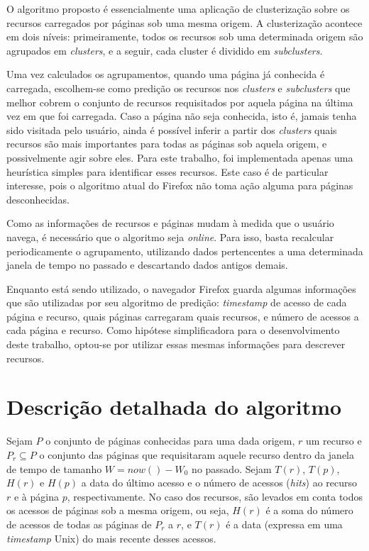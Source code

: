 \documentclass[10pt,twocolumn,letterpaper]{article}
\begin{document}
O algoritmo proposto é essencialmente uma aplicação de clusterização sobre os recursos carregados por páginas sob uma mesma origem. A clusterização acontece em dois níveis: primeiramente, todos os recursos sob uma determinada origem são agrupados em \emph{clusters}, e a seguir, cada cluster é dividido em \emph{subclusters}.

Uma vez calculados os agrupamentos, quando uma página já conhecida é carregada, escolhem-se como predição os recursos nos \emph{clusters} e \emph{subclusters} que melhor cobrem o conjunto de recursos requisitados por aquela página na última vez em que foi carregada. Caso a página não seja conhecida, isto é, jamais tenha sido visitada pelo usuário, ainda é possível inferir a partir dos \emph{clusters} quais recursos são mais importantes para todas as páginas sob aquela origem, e possivelmente agir sobre eles. Para este trabalho, foi implementada apenas uma heurística simples para identificar esses recursos. Este caso é de particular interesse, pois o algoritmo atual do Firefox não toma ação alguma para páginas desconhecidas. 

Como as informações de recursos e páginas mudam à medida que o usuário navega, é necessário que o algoritmo seja \emph{online}. Para isso, basta recalcular periodicamente o agrupamento, utilizando dados pertencentes a uma determinada janela de tempo no passado e descartando dados antigos demais.

Enquanto está sendo utilizado, o navegador Firefox guarda algumas informações que são utilizadas por seu algoritmo de predição: \emph{timestamp} de acesso de cada página e recurso, quais páginas carregaram quais recursos, e número de acessos a cada página e recurso. Como hipótese simplificadora para o desenvolvimento deste trabalho, optou-se por utilizar essas mesmas informações para descrever recursos.

\section{Descrição detalhada do algoritmo}
\label{sec-algorithm-detail}

Sejam $P$ o conjunto de páginas conhecidas para uma dada origem, $r$ um recurso e $P_{r} \subseteq P$ o conjunto das páginas que requisitaram aquele recurso dentro da janela de tempo de tamanho $W = now() - W_0$ no passado. Sejam $T(r)$,  $T(p)$, $H(r)$ e $H(p)$ a data do último acesso e o número de acessos (\emph{hits}) ao recurso $r$ e à página $p$, respectivamente. No caso dos recursos, são levados em conta todos os acessos de páginas sob a mesma origem, ou seja, $H(r)$ é a soma do número de acessos de todas as páginas de $P_{r}$ a $r$, e $T(r)$ é a data (expressa em uma \emph{timestamp} Unix) do mais recente desses acessos.
\end{document}
